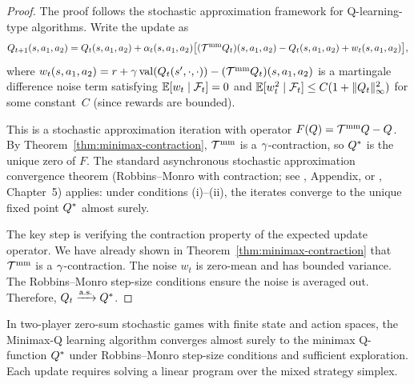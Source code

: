 \documentclass[11pt,a4paper]{article}
\begin{document}
\begin{proof}
The proof follows the stochastic approximation framework for
Q-learning-type algorithms.  Write the update as
\[
  Q_{t+1}(s,a_1,a_2)
  = Q_t(s,a_1,a_2) + \alpha_t(s,a_1,a_2)
    \bigl[ (\mathcal{T}^{\mathrm{mm}} Q_t)(s,a_1,a_2) - Q_t(s,a_1,a_2)
    + w_t(s,a_1,a_2) \bigr],
\]
where $w_t(s,a_1,a_2) = r + \gamma\, \mathrm{val}(Q_t(s',\cdot,\cdot))
- (\mathcal{T}^{\mathrm{mm}} Q_t)(s,a_1,a_2)$ is a martingale difference
noise term satisfying $\mathbb{E}[w_t \mid \mathcal{F}_t] = 0$ and
$\mathbb{E}[w_t^2 \mid \mathcal{F}_t] \le C(1 + \|Q_t\|_\infty^2)$ for some
constant~$C$ (since rewards are bounded).

This is a stochastic approximation iteration with operator
$F(Q) = \mathcal{T}^{\mathrm{mm}} Q - Q$.  By
Theorem~\ref{thm:minimax-contraction}, $\mathcal{T}^{\mathrm{mm}}$ is a
$\gamma$-contraction, so $Q^*$ is the unique zero of $F$.
The standard asynchronous stochastic approximation convergence theorem
(Robbins--Monro with contraction; see \citealt{suttonbarto2018},
Appendix, or \citealt{filar1997}, Chapter~5) applies: under conditions
(i)--(ii), the iterates converge to the unique fixed point $Q^*$
almost surely.

The key step is verifying the contraction property of the expected
update operator.  We have already shown in
Theorem~\ref{thm:minimax-contraction} that $\mathcal{T}^{\mathrm{mm}}$ is a
$\gamma$-contraction.  The noise $w_t$ is zero-mean and has bounded
variance.  The Robbins--Monro step-size conditions ensure the noise is
averaged out.  Therefore, $Q_t \xrightarrow{\text{a.s.}} Q^*$.
\end{proof}

\begin{keyresult}[title={Minimax-Q Convergence}]
In two-player zero-sum stochastic games with finite state and action
spaces, the Minimax-Q learning algorithm converges almost surely to the
minimax Q-function $Q^*$ under Robbins--Monro step-size conditions
and sufficient exploration.  Each update requires solving a linear
program over the mixed strategy simplex.
\end{keyresult}
\end{document}
